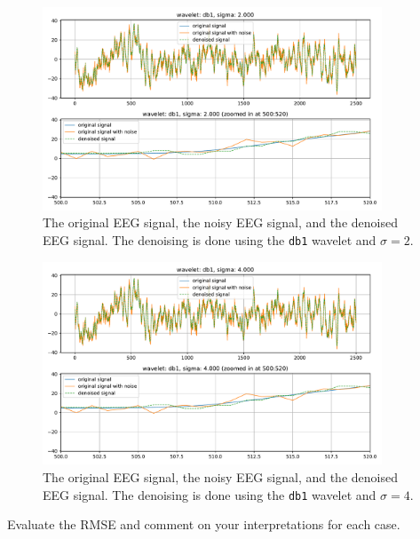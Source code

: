 \begin{figure}[H]
    \label{fig:problem3b_plot4}
    \centering
    \includegraphics[width=0.9\textwidth]{./img/problem3-denoised-signal-wavelet-db1-sigma-2.000.pdf}
    \caption{The original EEG signal, the noisy EEG signal, and the denoised EEG signal. The denoising is done using the \texttt{db1} wavelet and $\sigma = 2$.}
\end{figure}

\begin{figure}[H]
    \label{fig:problem3b_plot5}
    \centering
    \includegraphics[width=0.9\textwidth]{./img/problem3-denoised-signal-wavelet-db1-sigma-4.000.pdf}
    \caption{The original EEG signal, the noisy EEG signal, and the denoised EEG signal. The denoising is done using the \texttt{db1} wavelet and $\sigma = 4$.}
\end{figure}





\begin{tcolorbox}[colback=blue!5!white,colframe=blue!75!black,title=Problem 3.c]
    Evaluate the RMSE and comment on your interpretations for each case.
\end{tcolorbox}


